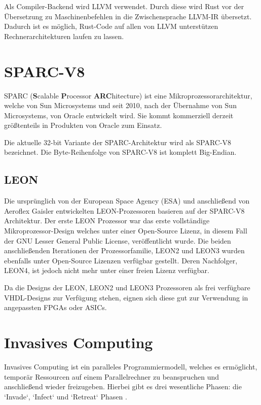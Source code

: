 Als Compiler-Backend wird LLVM verwendet. Durch diese wird Rust vor der Übersetzung zu Maschinenbefehlen in die Zwischensprache
LLVM-IR übersetzt. Dadurch ist es möglich, Rust-Code auf allen von LLVM unterstützen Rechnerarchitekturen laufen zu lassen.


\section{SPARC-V8}

SPARC (\textbf{S}calable \textbf{P}rocessor \textbf{ARC}hitecture) ist eine Mikroprozessorarchitektur, welche von Sun Microsystems und 
seit 2010\cite{sunWikiDe}, nach der Übernahme von Sun Microsystems, von Oracle entwickelt wird\cite{sparcWikiDe}. Sie kommt
kommerziell derzeit größtenteils in Produkten von Oracle zum Einsatz\cite{sparcWikiDe}.

Die aktuelle 32-bit Variante der SPARC-Architektur wird als SPARC-V8 bezeichnet\cite{sparcWikiDe}.
Die Byte-Reihenfolge von SPARC-V8 ist komplett Big-Endian\cite{sparcWikiDe}.

\subsection{LEON}

Die ursprünglich von der European Space Agency (ESA) und anschließend von Aeroflex Gaisler entwickelten LEON-Prozessoren
basieren auf der SPARC-V8 Architektur\cite{leonWikiDe}. 
Der erste LEON Prozessor war das erste vollständige Mikroprozessor-Design welches unter einer
Open-Source Lizenz, in diesem Fall der GNU Lesser General Public License, veröffentlicht wurde\cite{leonWikiDe}.
Die beiden anschließenden Iterationen
der Prozessorfamilie, LEON2 und LEON3 wurden ebenfalls unter Open-Source Lizenzen verfügbar gestellt\cite{leonWikiDe}.
Deren Nachfolger, LEON4, ist jedoch nicht mehr unter einer freien Lizenz verfügbar\cite{leonWikiDe}.

Da die Designs der LEON, LEON2 und LEON3 Prozessoren als frei verfügbare VHDL-Designs\cite{leonWikiDe} zur Verfügung stehen, eignen 
sich diese gut zur Verwendung in angepassten FPGAs oder ASICs\cite{leonWikiDe}.

\section{Invasives Computing}

Invasives Computing ist ein paralleles Programmiermodell, welches es ermöglicht, temporär Ressourcen auf einem Parallelrechner
zu beanspruchen und anschließend wieder freizugeben. Hierbei gibt es drei wesentliche Phasen: die `Invade`, `Infect` und `Retreat` Phasen \cite{invasicWikiOverview}. 

